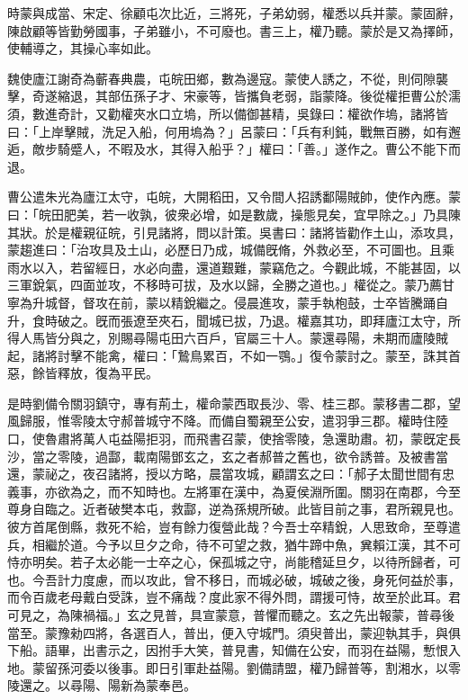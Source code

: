 \begin{pinyinscope}
時蒙與成當、宋定、徐顧屯次比近，三將死，子弟幼弱，權悉以兵并蒙。蒙固辭，陳啟顧等皆勤勞國事，子弟雖小，不可廢也。書三上，權乃聽。蒙於是又為擇師，使輔導之，其操心率如此。

魏使廬江謝奇為蘄春典農，屯皖田鄉，數為邊寇。蒙使人誘之，不從，則伺隙襲擊，奇遂縮退，其部伍孫子才、宋豪等，皆攜負老弱，詣蒙降。後從權拒曹公於濡須，數進奇計，又勸權夾水口立塢，所以備御甚精，吳錄曰：權欲作塢，諸將皆曰：「上岸擊賊，洗足入船，何用塢為？」呂蒙曰：「兵有利鈍，戰無百勝，如有邂逅，敵步騎蹙人，不暇及水，其得入船乎？」權曰：「善。」遂作之。曹公不能下而退。

曹公遣朱光為廬江太守，屯皖，大開稻田，又令間人招誘鄱陽賊帥，使作內應。蒙曰：「皖田肥美，若一收孰，彼衆必增，如是數歲，操態見矣，宜早除之。」乃具陳其狀。於是權親征皖，引見諸將，問以計策。吳書曰：諸將皆勸作土山，添攻具，蒙趨進曰：「治攻具及土山，必歷日乃成，城備旣脩，外救必至，不可圖也。且乘雨水以入，若留經日，水必向盡，還道艱難，蒙竊危之。今觀此城，不能甚固，以三軍銳氣，四面並攻，不移時可拔，及水以歸，全勝之道也。」權從之。蒙乃薦甘寧為升城督，督攻在前，蒙以精銳繼之。侵晨進攻，蒙手執枹鼓，士卒皆騰踊自升，食時破之。旣而張遼至夾石，聞城已拔，乃退。權嘉其功，即拜廬江太守，所得人馬皆分與之，別賜尋陽屯田六百戶，官屬三十人。蒙還尋陽，未期而廬陵賊起，諸將討擊不能禽，權曰：「鷙鳥累百，不如一鶚。」復令蒙討之。蒙至，誅其首惡，餘皆釋放，復為平民。

是時劉備令關羽鎮守，專有荊土，權命蒙西取長沙、零、桂三郡。蒙移書二郡，望風歸服，惟零陵太守郝普城守不降。而備自蜀親至公安，遣羽爭三郡。權時住陸口，使魯肅將萬人屯益陽拒羽，而飛書召蒙，使捨零陵，急還助肅。初，蒙旣定長沙，當之零陵，過酃，載南陽鄧玄之，玄之者郝普之舊也，欲令誘普。及被書當還，蒙祕之，夜召諸將，授以方略，晨當攻城，顧謂玄之曰：「郝子太聞世間有忠義事，亦欲為之，而不知時也。左將軍在漢中，為夏侯淵所圍。關羽在南郡，今至尊身自臨之。近者破樊本屯，救酃，逆為孫規所破。此皆目前之事，君所親見也。彼方首尾倒縣，救死不給，豈有餘力復營此哉？今吾士卒精銳，人思致命，至尊遣兵，相繼於道。今予以旦夕之命，待不可望之救，猶牛蹄中魚，兾賴江漢，其不可恃亦明矣。若子太必能一士卒之心，保孤城之守，尚能稽延旦夕，以待所歸者，可也。今吾計力度慮，而以攻此，曾不移日，而城必破，城破之後，身死何益於事，而令百歲老母戴白受誅，豈不痛哉？度此家不得外問，謂援可恃，故至於此耳。君可見之，為陳禍福。」玄之見普，具宣蒙意，普懼而聽之。玄之先出報蒙，普尋後當至。蒙豫勑四將，各選百人，普出，便入守城門。須臾普出，蒙迎執其手，與俱下船。語畢，出書示之，因拊手大笑，普見書，知備在公安，而羽在益陽，慙恨入地。蒙留孫河委以後事。即日引軍赴益陽。劉備請盟，權乃歸普等，割湘水，以零陵還之。以尋陽、陽新為蒙奉邑。


\end{pinyinscope}
